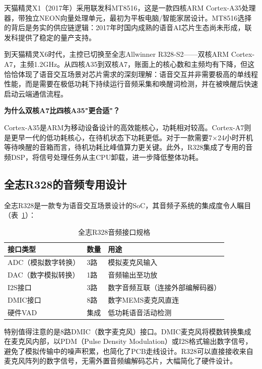 \documentclass[12pt, a4paper, twoside, openright]{book}
\begin{document}
天猫精灵X1（2017年）采用联发科MT8516，这是一款四核ARM Cortex-A35处理器，带独立NEON向量处理单元，最初为平板电脑/智能家居设计。MT8516选择的背后是务实的供应链逻辑：2017年时国内成熟的语音AI芯片生态尚未形成，联发科提供了稳定的量产支持。

到天猫精灵X6时代，主控已切换至全志Allwinner R328-S2——双核ARM Cortex-A7，主频1.2GHz。从四核A35到双核A7，账面上的核心数和主频均有下降，但这恰恰体现了语音交互场景对芯片需求的深刻理解：语音交互并非需要极高的单线程性能，而是需要在极低功耗下持续运行音频采集和唤醒词检测，并在被唤醒后快速启动云端通信流程。

\begin{techbox}
\textbf{为什么双核A7比四核A35"更合适"？}

Cortex-A35是ARM为移动设备设计的高效能核心，功耗相对较高。Cortex-A7则是更早一代的低功耗核心，在待机状态下功耗更低。对于一款需要7×24小时开机等待唤醒的音箱而言，待机功耗比峰值算力更关键。此外，R328集成了专用的音频DSP，将信号处理任务从主CPU卸载，进一步降低整体功耗。
\end{techbox}

\subsection{全志R328的音频专用设计}

全志R328是一款专为语音交互场景设计的SoC，其音频子系统的集成度令人瞩目（表~\ref{tab:r328-audio}）：

\begin{table}[H]
\centering
\caption{全志R328音频接口规格}
\label{tab:r328-audio}
\begin{tabular}{l l l}
\toprule
\textbf{接口类型} & \textbf{数量} & \textbf{用途} \\
\midrule
ADC（模拟数字转换） & 3路   & 模拟麦克风输入 \\
DAC（数字模拟转换） & 1路   & 音频输出至功放 \\
I2S接口            & 3路   & 数字音频互联（连接外部编解码器）\\
DMIC接口           & 8路   & 数字MEMS麦克风直连 \\
硬件VAD            & 集成  & 低功耗语音活动检测 \\
\bottomrule
\end{tabular}
\end{table}

特别值得注意的是8路DMIC（数字麦克风）接口。DMIC麦克风将模数转换集成在麦克风内部，以PDM（Pulse Density Modulation）或I2S格式输出数字信号，避免了模拟传输中的噪声积累，也简化了PCB走线设计。R328可以直接接收来自麦克风阵列的数字信号，无需外置音频编解码芯片，大幅简化了硬件设计。
\end{document}
